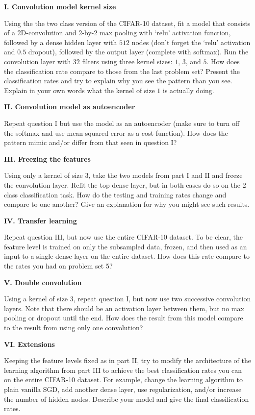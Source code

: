 \documentclass[12pt]{article}
\begin{document}
\textbf{I. Convolution model kernel size}

Using the the two class version of the CIFAR-10 dataset, fit a model that
consists of a 2D-convolution and $2$-by-$2$ max pooling with `relu' activation
function, followed by a dense hidden layer with $512$
nodes (don't forget the `relu' activation and $0.5$ dropout), followed by the
output layer (complete with softmax). Run the convolution layer with $32$
filters using three kernel sizes: $1$, $3$, and $5$. How does the classification rate compare to
those from the last problem set? Present the classification rates and try
to explain why you see the pattern than you see. Explain in your own words
what the kernel of size $1$ is actually doing.

\textbf{II. Convolution model as autoencoder}

Repeat question I but use the model as an autoencoder (make sure to turn
off the softmax and use mean squared error as a cost function).
How does the pattern mimic and/or differ from that seen in question I?

\textbf{III. Freezing the features}

Using only a kernel of size $3$, take the two models from part I and II
and freeze the convolution layer. Refit the top dense layer, but in both
cases do so on the $2$ class classification task.
How do the testing and training rates change and compare to one another?
Give an explanation for why you might see such results.

\textbf{IV. Transfer learning}

Repeat question III, but now use the entire CIFAR-10 dataset. To be clear, the
feature level is trained on only the subsampled data, frozen, and then used as
an input to a single dense layer on the entire dataset. How does this rate compare
to the rates you had on problem set 5?

\textbf{V. Double convolution}

Using a kernel of size $3$, repeat question I, but now use two successive
convolution layers. Note that there should be an activation layer between
them, but no max pooling or dropout until the end. How does the result from
this model compare to the result from using only one convolution?

\textbf{VI. Extensions}

Keeping the feature levels fixed as in part II, try to modify the architecture of the
learning algorithm from part III to achieve the best classification rates you can on the
entire CIFAR-10 dataset. For example, change the learning algorithm to plain vanilla SGD,
add another dense layer, use regularization, and/or increase the number of hidden nodes.
Describe your model and give the final classification rates.
\end{document}
